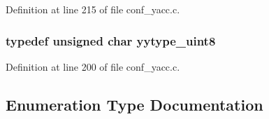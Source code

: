 Definition at line 215 of file conf\_\-yacc.c.
\subsubsection[{yytype\_\-uint8}]{\setlength{\rightskip}{0pt plus 5cm}typedef unsigned char {\bf yytype\_\-uint8}}\label{conf__yacc_8c_a79c09f9dcfd0f7a32f598ea3910d2206}


Definition at line 200 of file conf\_\-yacc.c.

\subsection{Enumeration Type Documentation}
